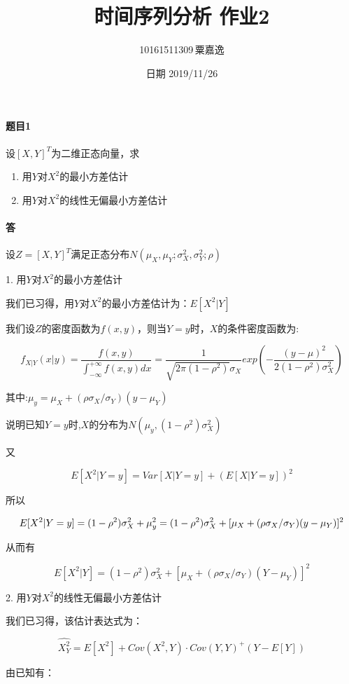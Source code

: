 \documentclass[12pt, a4paper]{ctexart}
\title{时间序列分析 作业2}
\author{10161511309\,粟嘉逸}
\date{日期 2019/11/26}
\begin{document}
\maketitle{}

\paragraph{题目1}
设$[X,Y]^T$为二维正态向量，求
        \begin{enumerate}
        \item 用$Y$对$X^2$的最小方差估计
        \item 用$Y$对$X^2$的线性无偏最小方差估计
        \end{enumerate}	
\paragraph{答}

设$Z=[X,Y]^T$满足正态分布$N(\mu_X,\mu_Y;\sigma_X^2,\sigma_Y^2;\rho)$

1. 用$Y$对$X^2$的最小方差估计

我们已习得，用$Y$对$X^2$的最小方差估计为：$E[X^2|Y]$

我们设$Z$的密度函数为$f(x,y)$，则当$Y=y$时，$X$的条件密度函数为:

\[
    f_{X|Y}(x|y)=\dfrac{f(x,y)}{\int_{-\infty}^{+\infty}f(x,y)dx}
    =\dfrac{1}{\sqrt{2\pi(1-\rho^2)}\sigma_X}exp(-\dfrac{(y-\mu)^2}{2(1-\rho^2)\sigma_X^2})
\]

其中:$\mu_y=\mu_X+(\rho\sigma_X/\sigma_Y)(y-\mu_Y)$

说明已知$Y=y$时,$X$的分布为$N(\mu_y,(1-\rho^2)\sigma_X^2)$

又

\[
    E[X^2|Y=y] = Var[X|Y=y] + (E[X|Y=y])^2
\]

所以

$$
    E[X^2|Y=y] = (1-\rho^2)\sigma_X^2 + \mu_y^2 \\
               = (1-\rho^2)\sigma_X^2 + [\mu_X+(\rho\sigma_X/\sigma_Y)(y-\mu_Y)]^2
$$

从而有

\[
    E[X^2|Y] = (1-\rho^2)\sigma_X^2 + [\mu_X+(\rho\sigma_X/\sigma_Y)(Y-\mu_Y)]^2
\]

2. 用$Y$对$X^2$的线性无偏最小方差估计

我们已习得，该估计表达式为：

\[
    \hat{X^2_Y} = E[X^2] + Cov(X^2,Y)\cdot Cov(Y,Y)^+ (Y-E[Y])
\]

由已知有：
\end{document}
